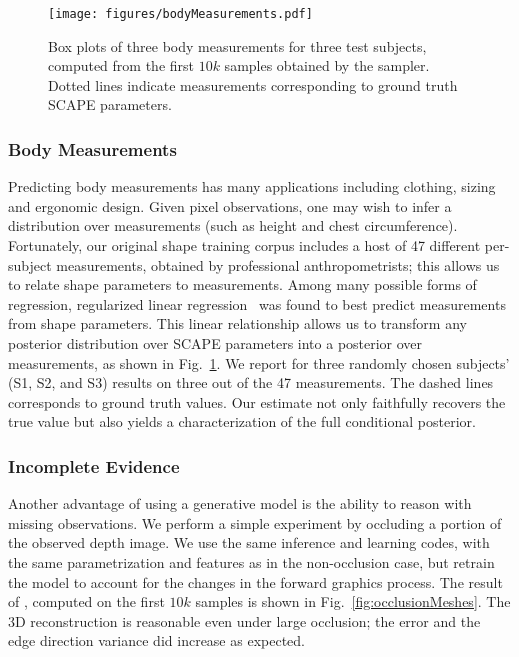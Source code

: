 \begin{figure}[!t]
  \begin{center}
    \centerline{\texttt{[image: figures/bodyMeasurements.pdf]}}
      {Box plots of three body measurements for three test
      subjects, computed from the first $10k$ samples obtained by the
      \MIXLMH sampler. Dotted lines indicate measurements
      corresponding to ground truth SCAPE parameters.}
    \label{bodyMeasurements}
  \end{center}
\end{figure}


\subsubsection{Body Measurements}
Predicting body measurements has many applications including clothing,
sizing and ergonomic design. Given pixel observations, one may wish to
infer a distribution over measurements (such as height and chest
circumference). Fortunately, our original shape training corpus
includes a host of 47 different per-subject measurements, obtained by
professional anthropometrists; this allows us to relate shape
parameters to measurements. Among many possible forms of regression,
regularized linear regression~\cite{zou2005regularization} was found
to best predict measurements from shape parameters. This linear
relationship allows us to transform any posterior distribution over
SCAPE parameters into a posterior over measurements, as shown in
Fig.~\ref{bodyMeasurements}. We report for three randomly chosen
subjects' (S1, S2, and S3) results on three out of the 47
measurements. The dashed lines corresponds to ground truth
values. Our estimate not only faithfully recovers the true value but also
yields a characterization of the full conditional posterior.

\subsubsection{Incomplete Evidence}

Another advantage of using a generative model is the ability
to reason with missing observations. We perform a simple
experiment by occluding a portion of the observed depth image.
We use the same inference and learning codes, with the same parametrization
and features as in the non-occlusion case, but retrain the model to account for
the changes in the forward graphics process. The result of \MIXLMH,
computed on the first $10k$ samples is shown in
Fig.~\ref{fig:occlusionMeshes}. The 3D reconstruction is reasonable even
under large occlusion; the error and the edge direction variance did
increase as expected.


